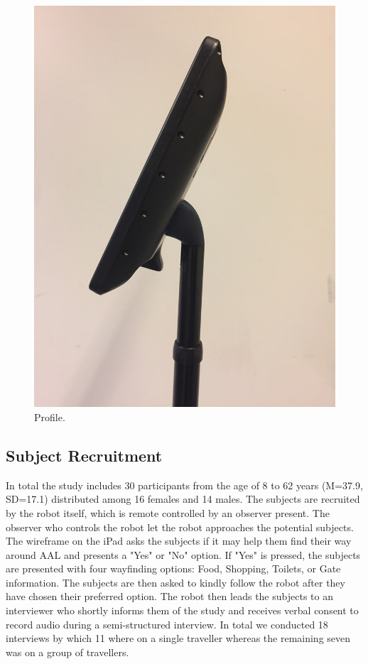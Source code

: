 \begin{figure}[H]
\begin{minipage}{.25\textwidth}
  \includegraphics[width=\linewidth, angle =-90]{Figure/ModificeretDoubleSideClose}
  \caption{Profile.}
  \label{fig:ModificeretDoubleSideClose}
\end{minipage}
\end{figure}
\noindent
%
\subsection{Subject Recruitment}
In total the study includes 30 participants from the age of 8 to 62 years (M=37.9, SD=17.1) distributed among 16 females and 14 males. The subjects are recruited by the robot itself, which is remote controlled by an observer present. The observer who controls the robot let the robot approaches the potential subjects. The wireframe on the iPad asks the subjects if it may help them find their way around AAL and presents a "Yes" or "No" option. If "Yes" is pressed, the subjects are presented with four wayfinding options: Food, Shopping, Toilets, or Gate information. The subjects are then asked to kindly follow the robot after they have chosen their preferred option. The robot then leads the subjects to an interviewer who shortly informs them of the study and receives verbal consent to record audio during a semi-structured interview. In total we conducted 18 interviews by which 11 where on a single traveller whereas the remaining seven was on a group of travellers. 
 
